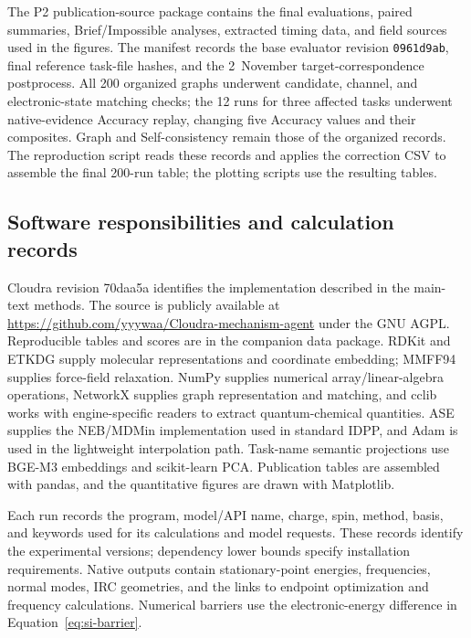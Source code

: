 The P2 publication-source package contains the final evaluations, paired summaries, Brief/Impossible analyses, extracted timing data, and field sources used in the figures. The manifest  records the base evaluator revision \texttt{0961d9ab}, final reference task-file hashes, and the 2~November target-correspondence postprocess. All 200 organized graphs underwent candidate, channel, and electronic-state matching checks; the 12 runs for three affected tasks underwent native-evidence Accuracy replay, changing five Accuracy values and their composites. Graph and Self-consistency remain those of the organized records. The reproduction script reads these records and applies the correction CSV to assemble the final 200-run table; the plotting scripts use the resulting tables.

\subsection{Software responsibilities and calculation records}
Cloudra revision 70daa5a identifies the implementation described in the main-text methods.\citep{ref14} The source is publicly available at \url{https://github.com/yyywaa/Cloudra-mechanism-agent} under the GNU AGPL. Reproducible tables and scores are in the companion data package. RDKit and ETKDG supply molecular representations and coordinate embedding; MMFF94 supplies force-field relaxation.\citep{ref12,etkdg2020,ref13,mmff941996} NumPy supplies numerical array/linear-algebra operations, NetworkX supplies graph representation and matching, and cclib works with engine-specific readers to extract quantum-chemical quantities.\citep{numpy2020,networkx2008,cclib2008} ASE supplies the NEB/MDMin implementation used in standard IDPP, and Adam is used in the lightweight interpolation path.\citep{ref08,neb2000,ase2017,adam2015} Task-name semantic projections use BGE-M3 embeddings and scikit-learn PCA.\citep{bgem32024,sklearn2011} Publication tables are assembled with pandas, and the quantitative figures are drawn with Matplotlib.\citep{pandas2010,matplotlib2007}

Each run records the program, model/API name, charge, spin, method, basis, and keywords used for its calculations and model requests. These records identify the experimental versions; dependency lower bounds specify installation requirements. Native outputs contain stationary-point energies, frequencies, normal modes, IRC geometries, and the links to endpoint optimization and frequency calculations. Numerical barriers use the electronic-energy difference in Equation~\ref{eq:si-barrier}.

